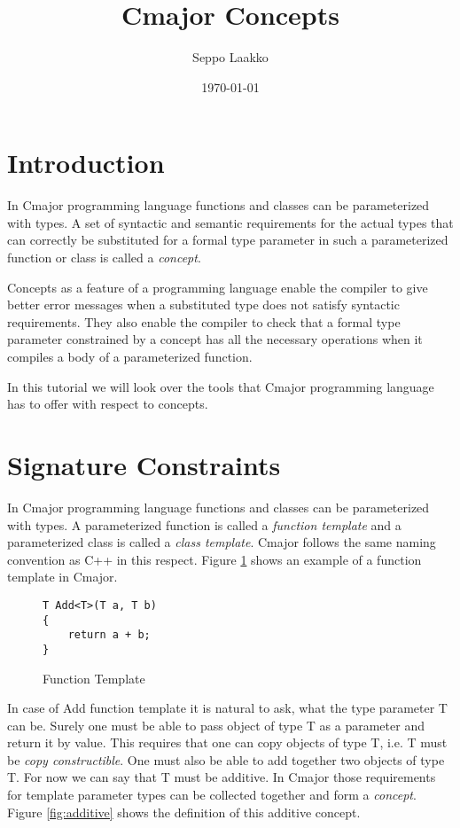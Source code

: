 \documentclass[oneside, a4paper, 11pt]{article}
\begin{document}
\title{Cmajor Concepts}
\author{Seppo Laakko}
\date{\today}
\maketitle

\section{Introduction}

In Cmajor programming language functions and classes can be parameterized with types.
A set of syntactic and semantic requirements for the actual types that can correctly be
substituted for a formal type parameter in such a parameterized function or class is
called a \emph{concept}.

Concepts as a feature of a programming language enable the compiler to give better error
messages when a substituted type does not satisfy syntactic requirements.
They also enable the compiler to check that a formal type parameter
constrained by a concept has all the necessary operations when it compiles a body of a
parameterized function.

In this tutorial we will look over the tools that Cmajor programming language has to offer
with respect to concepts.

\section{Signature Constraints}

In Cmajor programming language functions and classes can be parameterized with types.
A parameterized function is called a \emph{function template} and
a parameterized class is called a \emph{class template}.
Cmajor follows the same naming convention as C++ in this respect.
Figure \ref{fig:funtemplate} shows an example of a function template in Cmajor.

\begin{figure}[htb]\caption{Function Template}\label{fig:funtemplate}
\begin{lstlisting}[frame=trBL]
T Add<T>(T a, T b)
{
    return a + b;
}
\end{lstlisting}
\end{figure}

In case of Add function template it is natural to ask, what the type parameter T can be.
Surely one must be able to pass object of type T as a parameter and return it by value.
This requires that one can copy objects of type T, i.e. T must be \emph{copy constructible}.
One must also be able to add together two objects of type T.
For now we can say that T must be additive.
In Cmajor those requirements for template parameter types can be collected together and
form a \emph{concept}. Figure \ref{fig:additive} shows the definition of this additive concept.
\end{document}
